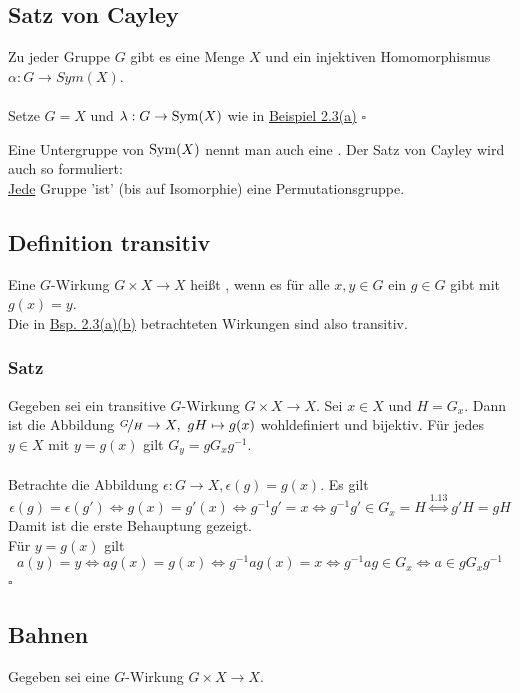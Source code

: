 \subsection{Satz von Cayley}
\label{sub:satz_von_cayley}
Zu jeder Gruppe $G$ gibt es eine Menge $X$ und ein injektiven Homomorphismus $\alpha:G\to Sym(X)$.\\

\\
Setze $G=X$ und $\lambda:G\to \operatorname{Sym}(X)$ wie in \hyperref[sub:bsp_wirkungen]{Beispiel 2.3(a)}
\hfill $\square$

Eine Untergruppe von $\operatorname{Sym}(X)$ nennt man auch eine . Der Satz von Cayley wird auch so formuliert:\\
\uline{Jede} Gruppe 'ist' (bis auf Isomorphie) eine Permutationsgruppe.

\subsection{Definition transitiv}
\label{sub:def_transitiv}
Eine $G$-Wirkung $G\times X\to X$ heißt , wenn es für alle $x,y\in G$ ein $g\in G$ gibt mit $g(x)=y$.\\
Die in \hyperref[sub:bsp_wirkungen]{Bsp. 2.3(a)(b)} betrachteten Wirkungen sind also transitiv.

\subsubsection*{Satz}
Gegeben sei ein transitive $G$-Wirkung $G\times X\to X$. Sei $x\in X$ und $H=G_x$. Dann ist die Abbildung $\nicefrac{G}{H}\to X,~gH\mapsto g(x)$ wohldefiniert und bijektiv. Für jedes $y\in X$ mit $y=g(x)$ gilt $G_y=gG_xg^{-1}$.\\

\\
Betrachte die Abbildung $\epsilon:G\to X,\epsilon(g)=g(x)$. Es gilt \[\epsilon(g)=\epsilon(g') \Leftrightarrow g(x)=g'(x) \Leftrightarrow g^{-1}g'=x \Leftrightarrow g^{-1}g'\in G_x=H \stackrel{\hyperref[sub:nebenklassen]{1.13}}{\Leftrightarrow} g'H=gH\]
Damit ist die erste Behauptung gezeigt.\\
Für $y=g(x)$ gilt \[a(y)=y \Leftrightarrow ag(x)=g(x) \Leftrightarrow g^{-1}ag(x)=x \Leftrightarrow g^{-1}ag\in G_x \Leftrightarrow a\in gG_xg^{-1}\]
\hfill $\square$

\subsection{Bahnen}
\label{sub:bahnen}
Gegeben sei eine $G$-Wirkung $G\times X\to X$.

